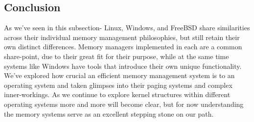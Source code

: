 \subsection{Conclusion}
\label{sec:Conclusion}
\par As we've seen in this subsection- Linux, Windows, and FreeBSD share similarities across their individual memory management philosophies, but still retain their own distinct differences.
Memory managers implemented in each are a common share-point, due to their great fit for their purpose, while at the same time systems like Windows have tools that introduce their own unique functionality.
We've explored how crucial an efficient memory management system is to an operating system and taken glimpses into their paging systems and complex inner-workings.
As we continue to explore kernel structures within different operating systems more and more will become clear, but for now understanding the memory systems serve as an excellent stepping stone on our path.
